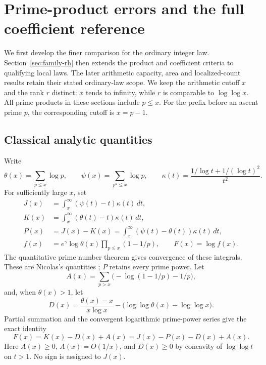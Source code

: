 \documentclass[11pt]{article}
\theoremstyle{definition}
\begin{document}
\section{Prime-product errors and the full coefficient reference}\label{sec:profile}
We first develop the finer comparison for the ordinary integer law.
Section~\ref{sec:family-rh} then extends the product and coefficient
criteria to qualifying local laws. The later arithmetic capacity,
area and localized-count results retain their stated ordinary-law
scope. We keep the arithmetic cutoff $x$ and the rank $r$ distinct:
$x$ tends to infinity,
while $r$ is comparable to $\log\log x$. All prime products in these
sections include $p\le x$. For the prefix before an ascent prime $p$,
the corresponding cutoff is $x=p-1$.

\subsection{Classical analytic quantities}
Write
\[
 \theta(x)=\sum_{p\le x}\log p,\qquad
 \psi(x)=\sum_{p^a\le x}\log p,\qquad
 \kappa(t)=\frac{1/\log t+1/(\log t)^2}{t^2}.
\]
For sufficiently large $x$, set
\begin{equation}\label{eq:analytic-objects}
\begin{split}
 J(x)&=\int_x^\infty(\psi(t)-t)\kappa(t)\,dt,\\
 K(x)&=\int_x^\infty(\theta(t)-t)\kappa(t)\,dt,\\
 P(x)&=J(x)-K(x)
       =\int_x^\infty(\psi(t)-\theta(t))\kappa(t)\,dt,\\
 f(x)&=e^\gamma\log\theta(x)
          \prod_{p\le x}(1-1/p),\qquad F(x)=\log f(x).
\end{split}
\end{equation}
The quantitative prime number theorem gives convergence of these
integrals. These are Nicolas's quantities
\cite[(1.9), (1.15)--(1.19)]{Nicolas2012}; $P$ retains every prime power.
Let
\[
 A(x)=\sum_{p>x}\bigl(-\log(1-1/p)-1/p\bigr),
\]
and, when $\theta(x)>1$, let
\[
 D(x)=\frac{\theta(x)-x}{x\log x}
       -\bigl(\log\log\theta(x)-\log\log x\bigr).
\]
Partial summation and the convergent logarithmic prime-power series give
the exact identity
\begin{equation}\label{eq:exact-nicolas}
 F(x)=K(x)-D(x)+A(x)=J(x)-P(x)-D(x)+A(x).
\end{equation}
Here $A(x)\ge0$, $A(x)=O(1/x)$, and $D(x)\ge0$ by concavity of
$\log\log t$ on $t>1$. No sign is assigned to $J(x)$.
\end{document}
